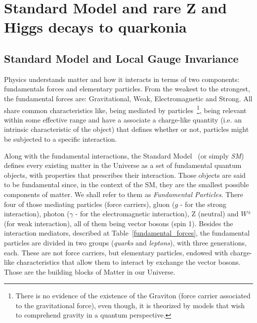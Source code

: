 \chapter{Standard Model and rare Z and Higgs decays to quarkonia}
\label{chaptertheory}

\section{Standard Model and Local Gauge Invariance}
\label{section_sm}

 
Physics understands matter and how it interacts in terms of two components: fundamentals forces and elementary particles. From the weakest to the strongest, the fundamental forces are: Gravitational, Weak, Electromagnetic and Strong. All share common characteristics like, being mediated by particles~\footnote{There is no evidence of the existence of the Graviton (force carrier associated to the gravitational force), even though, it is theorized by models that wish to comprehend gravity in a quantum perspective.}, being relevant within some effective range and have a associate a charge-like quantity (i.e. an intrinsic characteristic of the object) that defines whether or not, particles might be subjected to a specific interaction.

Along with the fundamental interactions, the Standard Model~\cite{burgess_moore_2006, oguri_qcd, Halzen:1984mc, Aitchison:2004cs} (or simply \textit{SM}) defines every existing matter in the Universe as a set of fundamental quantum objects, with properties that prescribes their interaction. Those objects are said to be fundamental since, in the context of the SM, they are the smallest possible components of matter. We shall refer to them as \textit{Fundamental Particles}. There four of those mediating particles (force carriers), gluon ($g$ - for the strong interaction), photon ($\gamma$ - for the electromagnetic interaction), Z (neutral) and $W^\pm$ (for weak interaction), all of them being vector bosons (spin 1). Besides the interaction mediators, described at Table~\ref{fundamental_forces}, the fundamental particles are divided in two groups (\textit{quarks} and \textit{leptons}), with three generations, each. These are not force carriers, but elementary particles, endowed with charge-like characteristics that allow them to interact by exchange the vector bosons. Those are the building blocks of Matter in our Universe.

